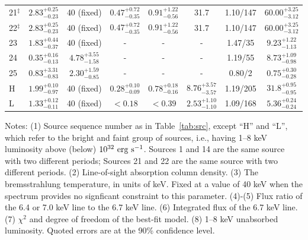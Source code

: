 \documentclass[fleqn,usenatbib]{mnras}
\begin{document}
\begin{table}
\begin{threeparttable}
\begin{spacing}{1.19}
\begin{tabular}{lccccccc}
21$^\ddag$ & $2.83^{+0.25}_{-0.23}$ & 40 (fixed)  & $0.47^{+0.72}_{-0.35}$ & $0.91^{+1.22}_{-0.56}$ & 31.7 & 1.10/147  & $60.00^{+3.25}_{-3.12}$
\\
22$^\ddag$ & $2.83^{+0.25}_{-0.23}$ & 40 (fixed)  & $0.47^{+0.72}_{-0.35}$ & $0.91^{+1.22}_{-0.56}$ &  31.7 & 1.10/147  & $60.00^{+3.25}_{-3.12}$
\\
23 & $1.83^{+0.44}_{-0.37}$ & 40 (fixed)  & - &-& - & 1.47/35  & $9.23^{+1.22}_{-1.13}$
\\
24 & $0.35^{+0.16}_{-0.13}$ & $4.78^{+3.55}_{-1.58}$ &-&-&-& 1.19/55  & 
$8.73^{+1.09}_{-0.98}$
\\
25 & $0.83^{+3.31}_{-0.83}$ & $2.30^{+1.59}_{-0.85}$ &-&-&-&  0.80/2 & $0.75^{+0.30}_{-0.28}$ 
\\
\hline
H & $1.99^{+0.10}_{-0.97}$ & 40 (fixed)  &  $0.28^{+0.10}_{-0.09}$ & $0.78^{+0.18}_{-0.16}$  & $8.76^{+3.57}_{-3.57}$ & 1.19/205 & $31.8^{+0.95}_{-0.95}	$
\\
L & $1.33^{+0.12}_{-0.11}$ & 40 (fixed)  & $<0.18$  & $<0.39$ & $2.53^{+1.10}_{-1.10}$ & 1.09/168 & $5.36^{+0.24}_{-0.24}$ \\
\hline
\end{tabular}
\end{spacing}
\begin{tablenotes}
      \small
      \item
      Notes: 
      (1) Source sequence number as in Table~\ref{tab:src}, except ``H'' and ``L'', which refer to the bright and faint group of sources, i.e., having 1--8 keV luminosity above (below) $10^{32}\rm~erg~s^{-1}$. {\dag}Sources 1 and 14 are the same source with two different periods; {\ddag}Sources 21 and 22 are the same source with two different periods. 
(2) Line-of-sight absorption column density.
(3) The bremsstrahlung temperature, in units of keV. Fixed at a value of 40 keV when the spectrum provides no signficant constraint to this parameter.
 (4)-(5) Flux ratio of the 6.4 or 7.0 keV line to the 6.7 keV line.
 (6) Integrated flux of the 6.7 keV line.
 (7) $\chi^2$ and degree of freedom of the best-fit model.
 (8) 1--8 keV unabsorbed luminosity. Quoted errors are at the 90\% confidence level.
\end{tablenotes} 
\end{threeparttable}
\end{table} 
 
%

\end{document}
